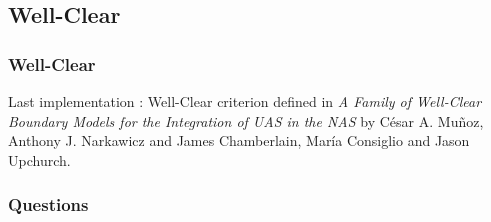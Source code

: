 \documentclass{beamer}
\begin{document}
\subsection{Well-Clear}
\begin{frame}
	\tableofcontents[currentsubsection,sectionstyle=show/shaded,subsectionstyle=show/shaded/hide]
\end{frame}


\begin{frame}[fragile]
	\frametitle{Well-Clear}
	
	Last implementation : Well-Clear criterion defined in \textit{A Family of Well-Clear Boundary Models for the Integration of UAS in the NAS} by C\'esar A. Mu\~{n}oz, Anthony J. Narkawicz and James Chamberlain, Mar\'ia Consiglio and Jason Upchurch.

\end{frame}

\begin{frame}
	\frametitle{Questions}
\end{frame}
  	
\end{document}
